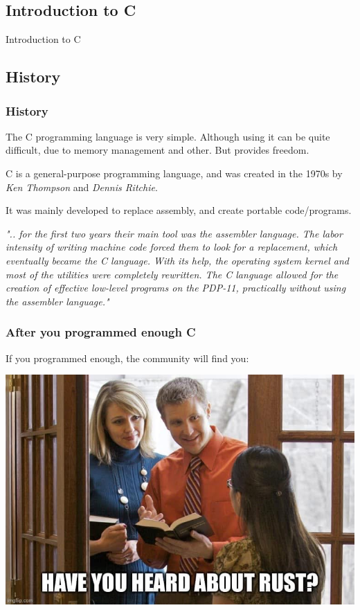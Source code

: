 \documentclass[
	11pt, %
]{beamer}
\newcommand{\quotetext}[1]{\begin{block}\footnotesize\textit{#1}\end{block}}
\begin{document}
\begin{frame}
    \section{Introduction to C}
	\begin{center}
		{\Huge Introduction to C}
	\end{center}
\end{frame}

\begin{frame}
    \subsection{History}
	\frametitle{History}

    The C programming language is very simple.
    Although using it can be quite difficult, due to memory management and other.
    But provides freedom.

    \bigskip

    C is a general-purpose programming language, and was created in the 1970s by \textit{Ken Thompson} and \textit{Dennis Ritchie}. %

    \bigskip

    It was mainly developed to replace assembly, and create portable code/programs.

    \bigskip

    \quotetext{".. for the first two years their main tool was the assembler language. The labor intensity of writing machine code forced them to look for a replacement, which eventually became the C language. With its help, the operating system kernel and most of the utilities were completely rewritten. The C language allowed for the creation of effective low-level programs on the PDP-11, practically without using the assembler language."}


\end{frame}

\begin{frame}
	\frametitle{After you programmed enough C}

    \begin{block}\footnotesize
        If you programmed enough, the community will find you:
    \end{block}

    \centering
    \includegraphics[width=.8\textwidth]{images/linux-jehovas.jpg}

\end{frame}
\end{document}
